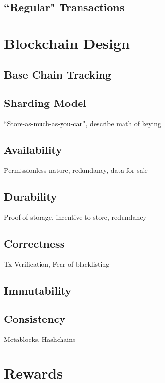 \documentclass{article}
\begin{document}
\subsection{``Regular" Transactions}

\section{Blockchain Design}

\subsection{Base Chain Tracking}

\subsection{Sharding Model}

``Store-as-much-as-you-can", describe math of keying

\subsection{Availability}

Permissionless nature, redundancy, data-for-sale

\subsection{Durability}

Proof-of-storage, incentive to store, redundancy

\subsection{Correctness}

Tx Verification, Fear of blacklisting

\subsection{Immutability}

\subsection{Consistency}

Metablocks, Hashchains

\section{Rewards}
\end{document}

